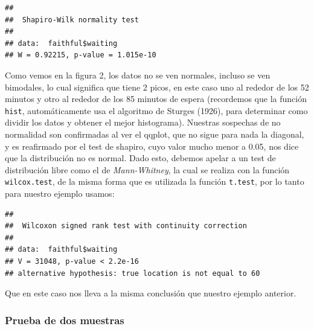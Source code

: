 \documentclass[]{article}
\newenvironment{Shaded}{\begin{snugshade}}{\end{snugshade}}
\newcommand{\KeywordTok}[1]{\textcolor[rgb]{0.13,0.29,0.53}{\textbf{#1}}}
\newcommand{\DataTypeTok}[1]{\textcolor[rgb]{0.13,0.29,0.53}{#1}}
\newcommand{\DecValTok}[1]{\textcolor[rgb]{0.00,0.00,0.81}{#1}}
\newcommand{\StringTok}[1]{\textcolor[rgb]{0.31,0.60,0.02}{#1}}
\newcommand{\OperatorTok}[1]{\textcolor[rgb]{0.81,0.36,0.00}{\textbf{#1}}}
\newcommand{\NormalTok}[1]{#1}
\begin{document}
\begin{Shaded}
\end{Shaded}

\begin{verbatim}
## 
##  Shapiro-Wilk normality test
## 
## data:  faithful$waiting
## W = 0.92215, p-value = 1.015e-10
\end{verbatim}

Como vemos en la figura 2, los datos no se ven normales, incluso se ven
bimodales, lo cual significa que tiene 2 picos, en este caso uno al
rededor de los 52 minutos y otro al rededor de los 85 minutos de espera
(recordemos que la función \texttt{hist}, automáticamente usa el
algoritmo de Sturges (1926), para determinar como dividir los datos y
obtener el mejor histograma). Nuestras sospechas de no normalidad son
confirmadas al ver el qqplot, que no sigue para nada la diagonal, y es
reafirmado por el test de shapiro, cuyo valor mucho menor a 0.05, nos
dice que la distribución no es normal. Dado esto, debemos apelar a un
test de distribución libre como el de \emph{Mann-Whitney}, la cual se
realiza con la función \texttt{wilcox.test}, de la misma forma que es
utilizada la función \texttt{t.test}, por lo tanto para nuestro ejemplo
usamos:

\begin{Shaded}
\end{Shaded}

\begin{verbatim}
## 
##  Wilcoxon signed rank test with continuity correction
## 
## data:  faithful$waiting
## V = 31048, p-value < 2.2e-16
## alternative hypothesis: true location is not equal to 60
\end{verbatim}

Que en este caso nos lleva a la misma conclusión que nuestro ejemplo
anterior.

\subsubsection{Prueba de dos muestras}\label{prueba-de-dos-muestras}
\end{document}
